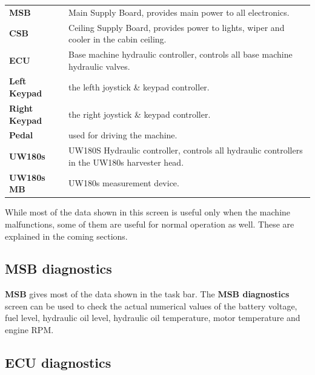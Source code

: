 \documentclass[12pt,a4paper,english]{uvmanual}
\begin{document}
\begin{tabular}{ L{0.2\textwidth} L{0.66\textwidth} }
\textbf{MSB} & Main Supply Board, provides main power to all electronics. \\
\textbf{CSB} & Ceiling Supply Board, provides power to lights, wiper and cooler in the cabin ceiling. \\
\textbf{ECU} & Base machine hydraulic controller, controls all base machine hydraulic valves. \\
\textbf{Left Keypad} & the lefth joystick \& keypad controller. \\
\textbf{Right Keypad} & the right joystick \& keypad controller. \\
\textbf{Pedal} & used for driving the machine. \\
\textbf{UW180s} & UW180S Hydraulic controller, controls all hydraulic controllers in the UW180s harvester head. \\
\textbf{UW180s MB} & UW180s measurement device. \\
\end{tabular}




While most of the data shown in this screen is useful only when the machine malfunctions, some of them are useful for normal operation as well. These are explained in the coming sections.

\FloatBarrier
\subsection{MSB diagnostics}\label{ch:system_diagnostics_msb}


\textbf{MSB} gives most of the data shown in the task bar. The \textbf{MSB diagnostics} screen can be used to check the actual numerical values of the battery voltage, fuel level, hydraulic oil level, hydraulic oil temperature, motor temperature and engine RPM.

\FloatBarrier
\subsection{ECU diagnostics}\label{ch:system_diagnostics_ecu}

\end{document}
